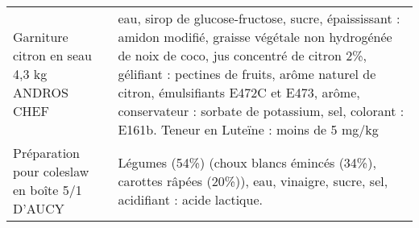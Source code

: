 \begin{longtable}{p{5cm}p{10cm}}
                                                              Garniture citron en seau 4,3 kg ANDROS CHEF &                                                                                                                                                                                                                                                                                                                                                                                                                                                                                                                                                                                                                                                                                       eau, sirop de glucose-fructose, sucre, épaississant : amidon modifié, graisse végétale non hydrogénée de noix de  coco, jus concentré de citron 2\%, gélifiant : pectines de fruits, arôme naturel de citron, émulsifiants E472C et  E473, arôme, conservateur : sorbate de potassium, sel, colorant : E161b.  Teneur en Luteïne : moins de 5 mg/kg \\
                                                            Préparation pour coleslaw en boîte 5/1 D'AUCY &                                                                                                                                                                                                                                                                                                                                                                                                                                                                                                                                                                                                                                                                                                                                                                                                                                                                                                               Légumes (54\%) (choux blancs émincés (34\%), carottes râpées (20\%)), eau, vinaigre, sucre, sel, acidifiant : acide lactique. \\

\end{longtable}
